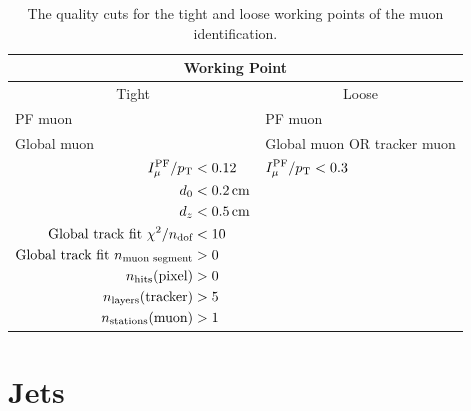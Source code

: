 \begin{table}[htb]
  \begin{center}
    \begin{tabular}{|l|l|}
\hline
\multicolumn{2}{|c|}{Working Point}\\
\hline
\multicolumn{1}{|c|}{Tight} & \multicolumn{1}{c|}{Loose} \\
\hline
PF muon & PF muon \\
Global muon & Global muon OR tracker muon \\
$\begin{aligned}
I^{\text{PF}}_{\mu}/p_{\mathrm{T}} &< 0.12 \\
d_0 &< 0.2\,\text{cm} \\
d_z &< 0.5\,\text{cm} \\
\text{Global track fit } \chi^2/n_{\text{dof}} &< 10 \\
\text{Global track fit } n_{\text{muon segment}} &> 0 \\
n_{\text{hits}}(\text{pixel}) &> 0 \\
n_{\text{layers}}(\text{tracker}) &> 5 \\
n_{\text{stations}}(\text{muon}) &> 1
\end{aligned}$
&
$\begin{aligned}
I^{\text{PF}}_{\mu}/p_{\mathrm{T}} &< 0.3 \\
\\
\\
\\
\\
\\
\\
\\
\end{aligned}$ \\
\hline
    \end{tabular}
    \caption{The quality cuts for the tight and loose working points of the muon identification.}
    \label{tab:muonWP}
  \end{center}
\end{table}

\section{Jets
\label{sec:jet-reco}}


